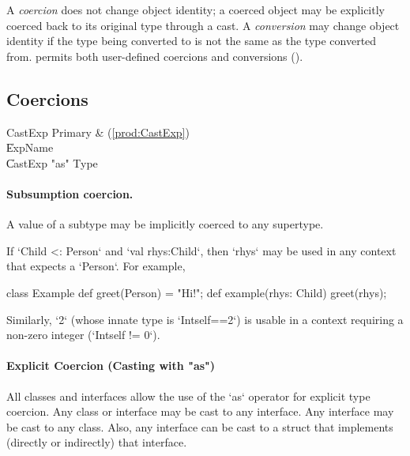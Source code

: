 A {\em coercion} does not change object identity; a coerced object may
be explicitly coerced back to its original type through a cast. A {\em
  conversion} may change object identity if the type being converted
to is not the same as the type converted from. \Xten{} permits both 
user-defined coercions and conversions ().


\subsection{Coercions}

\begin{bbgrammar}
             CastExp \: Primary & (\ref{prod:CastExp}) \\
                     \| ExpName \\
                     \| CastExp \xcd"as" Type \\
\end{bbgrammar}


\paragraph{Subsumption coercion.}
A value of a subtype may be implicitly coerced to any supertype.  

\begin{ex}
If \xcd`Child <: Person` and \xcd`val rhys:Child`, then \xcd`rhys` may be used
in any context that expects a \xcd`Person`.  For example, 
\begin{xten}
class Example {
  def greet(Person) = "Hi!";
  def example(rhys: Child) {
     greet(rhys);
  }
}
\end{xten}
%

Similarly, \xcd`2` (whose innate type is \xcd`Int{self==2}`)
is usable in a context requiring a non-zero integer
(\xcd`Int{self != 0}`).  
\end{ex}

\paragraph{Explicit Coercion (Casting with \xcd"as")}

All classes and interfaces allow the use of the \xcd`as` operator for explicit
type coercion.  
Any class or
interface may be cast to any interface.  
Any interface may be cast to
any class.  Also, any interface can be cast to a struct that implements
(directly or indirectly) that interface.


